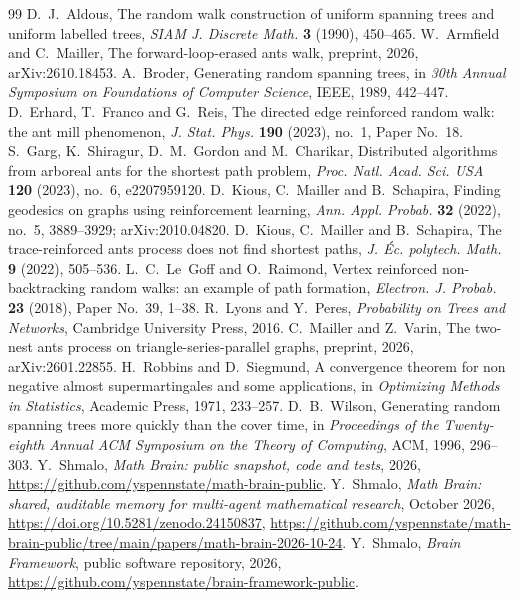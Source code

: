 \documentclass[11pt]{amsart}
\theoremstyle{remark}
\begin{document}
\begin{thebibliography}{99}
 D.~J.~Aldous, The random walk construction of uniform spanning trees and uniform labelled trees,
\emph{SIAM J. Discrete Math.} \textbf{3} (1990), 450--465.
 W.~Armfield and C.~Mailler, The forward-loop-erased ants walk, preprint, 2026, arXiv:2610.18453.
 A.~Broder, Generating random spanning trees, in \emph{30th Annual Symposium on Foundations of Computer
Science}, IEEE, 1989, 442--447.
 D.~Erhard, T.~Franco and G.~Reis, The directed edge reinforced random walk: the ant mill phenomenon,
\emph{J. Stat. Phys.} \textbf{190} (2023), no.~1, Paper No.~18.
 S.~Garg, K.~Shiragur, D.~M.~Gordon and M.~Charikar, Distributed algorithms from arboreal ants for the
shortest path problem, \emph{Proc. Natl. Acad. Sci. USA} \textbf{120} (2023), no.~6, e2207959120.
 D.~Kious, C.~Mailler and B.~Schapira, Finding geodesics on graphs using reinforcement learning,
\emph{Ann. Appl. Probab.} \textbf{32} (2022), no.~5, 3889--3929; arXiv:2010.04820.
 D.~Kious, C.~Mailler and B.~Schapira, The trace-reinforced ants process does not find shortest paths,
\emph{J. \'Ec. polytech. Math.} \textbf{9} (2022), 505--536.
 L.~C.~Le~Goff and O.~Raimond, Vertex reinforced non-backtracking random walks: an example of path
formation, \emph{Electron. J. Probab.} \textbf{23} (2018), Paper No.~39, 1--38.
 R.~Lyons and Y.~Peres, \emph{Probability on Trees and Networks}, Cambridge University Press, 2016.
 C.~Mailler and Z.~Varin, The two-nest ants process on triangle-series-parallel graphs,
preprint, 2026, arXiv:2601.22855.
 H.~Robbins and D.~Siegmund, A convergence theorem for non negative almost supermartingales and some
applications, in \emph{Optimizing Methods in Statistics}, Academic Press, 1971, 233--257.
 D.~B.~Wilson, Generating random spanning trees more quickly than the cover time, in \emph{Proceedings
of the Twenty-eighth Annual ACM Symposium on the Theory of Computing}, ACM, 1996, 296--303.
 Y.~Shmalo, \emph{Math Brain: public snapshot, code and tests}, 2026,
\url{https://github.com/yspennstate/math-brain-public}.
 Y.~Shmalo, \emph{Math Brain: shared, auditable memory for multi-agent mathematical research},
October 2026, \url{https://doi.org/10.5281/zenodo.24150837},
\url{https://github.com/yspennstate/math-brain-public/tree/main/papers/math-brain-2026-10-24}.
 Y.~Shmalo, \emph{Brain Framework}, public software repository, 2026,
\url{https://github.com/yspennstate/brain-framework-public}.
\end{thebibliography}
\end{document}
